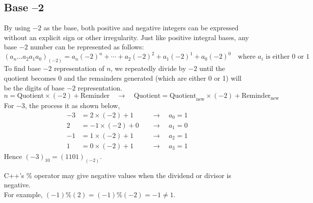 \documentclass[../../Problems]{subfiles}
\begin{document}
\subsection{Base --2}
By using $-2$ as the base, both positive and negative integers can be expressed without an explicit sign or other irregularity. Just like positive integral bases, any base $-2$ number can be represented as follows:
\begin{equation}
(a_n\ldots a_2a_1a_0)_{(-2)} = a_n(-2)^n+\cdots+a_2(-2)^2+a_1(-2)^1+a_0(-2)^0 \quad\text{where $a_i$ is either 0 or 1}
\end{equation}
To find base $-2$ representation of $n$, we repeatedly divide by $-2$ until the quotient becomes 0 and the remainders generated (which are either 0 or 1) will be the digits of base $-2$ representation.
\begin{equation*}
n = \text{Quotient}\times(-2) + \text{Reminder} \quad\rightarrow\quad \text{Quotient} = \text{Quotient}_{\text{new}}\times(-2) + \text{Reminder}_{\text{new}}
\end{equation*}
For $-3$, the process it as shown below,
\begin{equation*}
\begin{aligned}
-3&= 2\times(-2) + {1} &\quad\rightarrow\quad a_0 = 1\\
2&= -1\times(-2) + {0} &\quad\rightarrow\quad a_1 = 0\\
-1&= 1\times(-2) + {1} &\quad\rightarrow\quad a_2 = 1\\
1&= 0\times(-2) + {1} &\quad\rightarrow\quad a_3 = 1
\end{aligned}
\end{equation*}
Hence $(-3)_{10} = (1101)_{(-2)}$.
\begin{note}
C++'s \% operator may give negative values when the dividend or divisor is negative.\\
For example, $(-1)\%(2) = (-1)\%(-2) = -1 \neq 1$.
\end{note}
\end{document}
